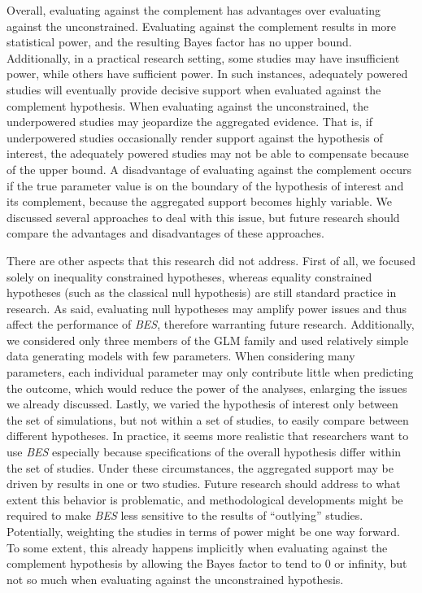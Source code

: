 \documentclass[
]{article}
\begin{document}
Overall, evaluating against the complement has advantages over
evaluating against the unconstrained. Evaluating against the complement
results in more statistical power, and the resulting Bayes factor has no
upper bound. Additionally, in a practical research setting, some studies
may have insufficient power, while others have sufficient power. In such
instances, adequately powered studies will eventually provide decisive
support when evaluated against the complement hypothesis. When
evaluating against the unconstrained, the underpowered studies may
jeopardize the aggregated evidence. That is, if underpowered studies
occasionally render support against the hypothesis of interest, the
adequately powered studies may not be able to compensate because of the
upper bound. A disadvantage of evaluating against the complement occurs
if the true parameter value is on the boundary of the hypothesis of
interest and its complement, because the aggregated support becomes
highly variable. We discussed several approaches to deal with this
issue, but future research should compare the advantages and
disadvantages of these approaches.

There are other aspects that this research did not address. First of
all, we focused solely on inequality constrained hypotheses, whereas
equality constrained hypotheses (such as the classical null hypothesis)
are still standard practice in research. As said, evaluating null
hypotheses may amplify power issues and thus affect the performance of
\emph{BES}, therefore warranting future research. Additionally, we
considered only three members of the GLM family and used relatively
simple data generating models with few parameters. When considering many
parameters, each individual parameter may only contribute little when
predicting the outcome, which would reduce the power of the analyses,
enlarging the issues we already discussed. Lastly, we varied the
hypothesis of interest only between the set of simulations, but not
within a set of studies, to easily compare between different hypotheses.
In practice, it seems more realistic that researchers want to use
\emph{BES} especially because specifications of the overall hypothesis
differ within the set of studies. Under these circumstances, the
aggregated support may be driven by results in one or two studies.
Future research should address to what extent this behavior is
problematic, and methodological developments might be required to make
\emph{BES} less sensitive to the results of ``outlying'' studies.
Potentially, weighting the studies in terms of power might be one way
forward. To some extent, this already happens implicitly when evaluating
against the complement hypothesis by allowing the Bayes factor to tend
to 0 or infinity, but not so much when evaluating against the
unconstrained hypothesis.
\end{document}
